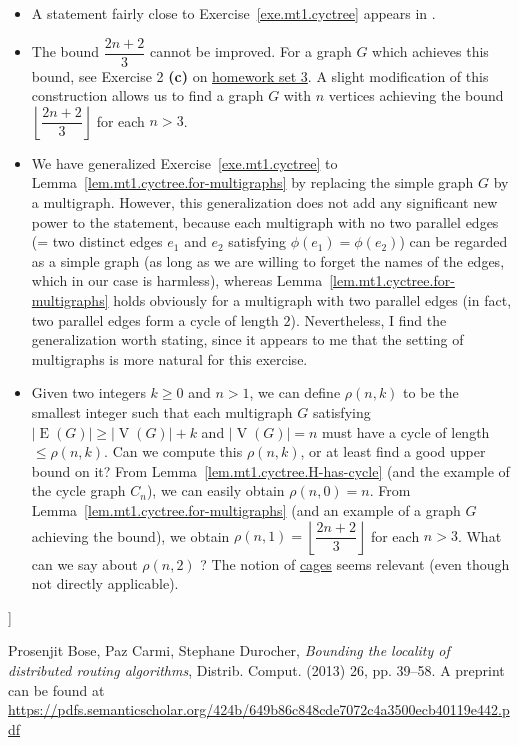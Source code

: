 \documentclass[numbers=enddot,12pt,final,onecolumn,notitlepage]{scrartcl}%
\newcounter{exer}
\theoremstyle{definition}
\newcommand{\abs}[1]{\left| #1 \right|}
\newcommand{\tup}[1]{\left( #1 \right)}
\newcommand{\floor}[1]{\left\lfloor #1 \right\rfloor}
\newcommand{\verts}[1]{\operatorname{V}\left( #1 \right)}
\newcommand{\edges}[1]{\operatorname{E}\left( #1 \right)}
\begin{document}
\begin{itemize}
\item A statement fairly close to
      Exercise~\ref{exe.mt1.cyctree} appears in
      \cite[Lemma 6]{BoCaDu13}.

\item The bound $\dfrac{2n+2}{3}$ cannot be improved.
      For a graph $G$ which achieves this bound, see
      Exercise 2 \textbf{(c)} on
      \href{http://www-users.math.umn.edu/~dgrinber/5707s17/hw3.pdf}{homework set 3}.
      A slight modification of this construction allows us to
      find a graph $G$ with $n$ vertices achieving the bound
      $\floor{\dfrac{2n+2}{3}}$ for each $n > 3$.

\item We have generalized Exercise~\ref{exe.mt1.cyctree} to
      Lemma~\ref{lem.mt1.cyctree.for-multigraphs} by replacing
      the simple graph $G$ by a multigraph. However, this
      generalization does not add any significant new power to
      the statement, because each multigraph with no two
      parallel edges (= two distinct edges $e_1$ and $e_2$
      satisfying $\phi\tup{e_1} = \phi\tup{e_2}$) can be
      regarded as a simple graph (as long as we are willing to
      forget the names of the edges, which in our case is
      harmless), whereas Lemma~\ref{lem.mt1.cyctree.for-multigraphs}
      holds obviously for a multigraph with two parallel edges
      (in fact, two parallel edges form a cycle of length $2$).
      Nevertheless, I find the generalization worth stating,
      since it appears to me that the setting of multigraphs
      is more natural for this exercise.

\item Given two integers $k \geq 0$ and $n > 1$, we can
      define $\rho\tup{n, k}$ to be the smallest integer such
      that each multigraph $G$ satisfying
      $\abs{\edges{G}} \geq \abs{\verts{G}} + k$ and
      $\abs{\verts{G}} = n$ must have a cycle of length
      $\leq \rho\tup{n, k}$. Can we compute this
      $\rho\tup{n, k}$, or at least find a good upper bound on
      it? From Lemma~\ref{lem.mt1.cyctree.H-has-cycle} (and the
      example of the cycle graph $C_n$), we can easily obtain
      $\rho\tup{n, 0} = n$. From
      Lemma~\ref{lem.mt1.cyctree.for-multigraphs} (and an
      example of a graph $G$ achieving the bound), we obtain
      $\rho\tup{n, 1} = \floor{\dfrac{2n+2}{3}}$ for each
      $n > 3$. What can we say about $\rho\tup{n, 2}$ ?
      The notion of
      \href{http://www.win.tue.nl/~aeb/drg/graphs/cages/cages.html}{cages}
      seems relevant (even though not directly applicable).
\end{itemize}
]

\begin{thebibliography}{999999}
Prosenjit Bose, Paz Carmi, Stephane Durocher,
\textit{Bounding the locality of distributed routing
algorithms},
Distrib. Comput. (2013) 26, pp. 39--58.
\newline A preprint can be found at
\url{https://pdfs.semanticscholar.org/424b/649b86c848cde7072c4a3500ecb40119e442.pdf}
\end{thebibliography}
\end{document}
